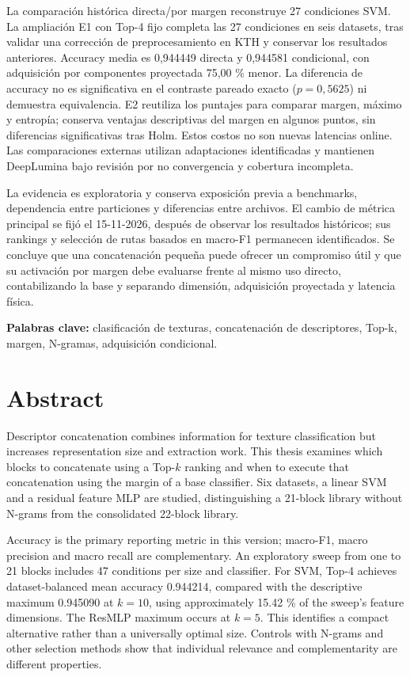 \documentclass[12pt,a4paper]{report}
\begin{document}
La comparación histórica directa/por margen reconstruye 27 condiciones SVM. La ampliación E1 con Top-4 fijo completa las 27 condiciones en seis datasets, tras validar una corrección de preprocesamiento en KTH y conservar los resultados anteriores. Accuracy media es 0,944449 directa y 0,944581 condicional, con adquisición por componentes proyectada 75,00 \% menor. La diferencia de accuracy no es significativa en el contraste pareado exacto (\(p=0,5625\)) ni demuestra equivalencia. E2 reutiliza los puntajes para comparar margen, máximo y entropía; conserva ventajas descriptivas del margen en algunos puntos, sin diferencias significativas tras Holm. Estos costos no son nuevas latencias online. Las comparaciones externas utilizan adaptaciones identificadas y mantienen DeepLumina bajo revisión por no convergencia y cobertura incompleta.

La evidencia es exploratoria y conserva exposición previa a benchmarks, dependencia entre particiones y diferencias entre archivos. El cambio de métrica principal se fijó el 15-11-2026, después de observar los resultados históricos; sus rankings y selección de rutas basados en macro-F1 permanecen identificados. Se concluye que una concatenación pequeña puede ofrecer un compromiso útil y que su activación por margen debe evaluarse frente al mismo uso directo, contabilizando la base y separando dimensión, adquisición proyectada y latencia física.

\textbf{Palabras clave:} clasificación de texturas, concatenación de descriptores, Top-k, margen, N-gramas, adquisición condicional.

\chapter*{Abstract}
Descriptor concatenation combines information for texture classification but increases representation size and extraction work. This thesis examines which blocks to concatenate using a Top-\(k\) ranking and when to execute that concatenation using the margin of a base classifier. Six datasets, a linear SVM and a residual feature MLP are studied, distinguishing a 21-block library without N-grams from the consolidated 22-block library.

Accuracy is the primary reporting metric in this version; macro-F1, macro precision and macro recall are complementary. An exploratory sweep from one to 21 blocks includes 47 conditions per size and classifier. For SVM, Top-4 achieves dataset-balanced mean accuracy 0.944214, compared with the descriptive maximum 0.945090 at \(k=10\), using approximately 15.42 \% of the sweep's feature dimensions. The ResMLP maximum occurs at \(k=5\). This identifies a compact alternative rather than a universally optimal size. Controls with N-grams and other selection methods show that individual relevance and complementarity are different properties.
\end{document}
